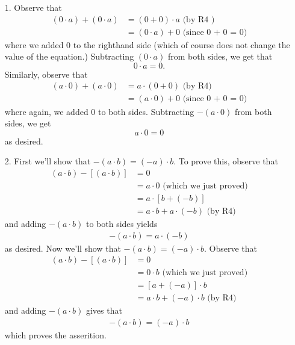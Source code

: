 \documentclass[12pt,letterpaper]{algebra_book}
\theoremstyle{definition}
\begin{document}
\begin{prf}
    \begin{itemize}
        \item[1.] Observe that 
        \begin{align*}
            (0 \cdot a) + (0 \cdot a) &= (0 + 0) \cdot a \text{ (by R4 )}\\
            & = (0 \cdot a) + 0 \text{  (since 0 + 0 = 0)}
        \end{align*}
        where we added
        $0$ to the righthand side (which of course 
        does not change the value of the equation.) Subtracting
        $(0 \cdot a)$ from both sides, we get that 
        \[
            0 \cdot a  = 0.
        \]
        Similarly, observe that 
        \begin{align*}
            (a \cdot 0) + (a \cdot 0) & = a \cdot (0 + 0) \text{ (by R4)}\\
            & = (a \cdot 0)+ 0 \text{ (since 0 + 0 = 0)}
        \end{align*}
        where again, we added $0$ to both sides. Subtracting $-(a
        \cdot 0)$ from both sides, we get 
        \[
            a \cdot 0 = 0
        \]
        as desired. 
        
        \item[2.] First we'll show that $-(a \cdot b) = (-a) \cdot
        b$. To prove this, observe that 
        \begin{align*}
            (a \cdot b) - [(a \cdot b)] & = 0 \\
            & = a \cdot 0 \text{ (which we just proved)}\\
            & = a \cdot [b + (-b)]\\
            & = a \cdot b + a \cdot (-b) \text{ (by R4)}
        \end{align*}
        and adding $-(a \cdot b)$ to both sides yields 
        \begin{align*}
            -(a \cdot b) = a \cdot (-b)
        \end{align*}
        as desired. Now we'll show that $-(a \cdot b) = (-a) \cdot
        b$. Observe that 
        \begin{align*}
            (a \cdot b) - [(a \cdot b)] & = 0 \\
            & = 0 \cdot b \text{ (which we just proved)}\\
            & = [a + (-a)] \cdot b\\
            & = a \cdot b + (-a) \cdot b \text{ (by R4)}
        \end{align*}
        and adding $-(a \cdot b)$ gives that 
        \begin{align*}
            -(a \cdot b) = (-a) \cdot b
        \end{align*}
        which proves the asserition.


\end{itemize}
\end{prf}
\end{document}
